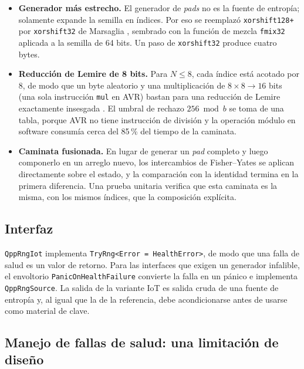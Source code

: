 \begin{itemize}
    \item \textbf{Generador más estrecho.} El generador de \textit{pads} no es la fuente de entropía; solamente expande la semilla en índices. Por eso se reemplazó \texttt{xorshift128+} por \texttt{xorshift32} de Marsaglia \cite{Marsaglia2003XorshiftRNGs}, sembrado con la función de mezcla \texttt{fmix32} aplicada a la semilla de 64 bits. Un paso de \texttt{xorshift32} produce cuatro bytes.
    \item \textbf{Reducción de Lemire de 8 bits.} Para $N \leq 8$, cada índice está acotado por 8, de modo que un byte aleatorio y una multiplicación de $8 \times 8 \rightarrow 16$ bits (una sola instrucción \texttt{mul} en AVR) bastan para una reducción de Lemire exactamente insesgada \cite{Lemire2019FastInterval}. El umbral de rechazo $256 \bmod b$ se toma de una tabla, porque AVR no tiene instrucción de división y la operación módulo en software consumía cerca del 85\,\% del tiempo de la caminata.
    \item \textbf{Caminata fusionada.} En lugar de generar un \textit{pad} completo y luego componerlo en un arreglo nuevo, los intercambios de Fisher--Yates se aplican directamente sobre el estado, y la comparación con la identidad termina en la primera diferencia. Una prueba unitaria verifica que esta caminata es la misma, con los mismos índices, que la composición explícita.
\end{itemize}

\subsection{Interfaz}

\texttt{QppRngIot} implementa \texttt{TryRng<Error = HealthError>}, de modo que una falla de salud es un valor de retorno. Para las interfaces que exigen un generador infalible, el envoltorio \texttt{PanicOnHealthFailure} convierte la falla en un pánico e implementa \texttt{QppRngSource}. La salida de la variante IoT es salida cruda de una fuente de entropía y, al igual que la de la referencia, debe acondicionarse antes de usarse como material de clave.

\subsection{Manejo de fallas de salud: una limitación de diseño}
\label{sec:limitacion_panico}

